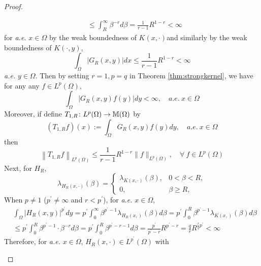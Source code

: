 \begin{proof}
\begin{enumerate}[label=(\Roman*)]
\begin{equation*}
\begin{aligned}
				& \leq \int_R^{\infty} \beta^{-r} d \beta=\frac{1}{r-1} R^{1-r}<\infty
			\end{aligned}
		\end{equation*}
		for \emph{a.e.} $x \in \Omega$ by the weak boundedness of $K(x,\cdot)$and similarly by the weak boundedness of $K(\cdot,y)$, 
		\begin{equation*}
			\int_{\Omega}\left|G_R(x, y)\right| d x \leq \frac{1}{r-1} R^{1-r}<\infty
		\end{equation*}
		\emph{a.e.} $y \in \Omega$. Then by setting $r = 1, p = q$ in Theorem \ref{thm:strongkernel}, we have for any any $f \in L^p(\Omega)$,
		\begin{equation*}
			\int_{\Omega}\left|G_R(x, y) f(y)\right| d y<\infty, \quad a.e. ~ x \in \Omega
		\end{equation*}
		Moreover, if define $T_{1,R} \colon L^p(\Omega) \rightarrow \mathbb{M}(\Omega)$ by
		\begin{equation*}
			\left(T_{1, R} f\right)(x):=\int_{\Omega} G_R(x, y) f(y) d y,\quad a.e.~ x \in \Omega
		\end{equation*}
		then
		\begin{equation*}
			\left\|T_{1, R} f\right\|_{L^p(\Omega)} \leq \frac{1}{r-1} R^{1-r}\|f\|_{L^p(\Omega)},\quad \forall~f \in L^p(\Omega)
		\end{equation*}
		Next, for $H_R$,
		\begin{equation*}
			\lambda_{H_R(x, \cdot)}(\beta)= \begin{cases}\lambda_{K(x, \cdot)}(\beta), & 0<\beta<R , \\ 0, & \beta \geq R ,\end{cases}
		\end{equation*}
		When $p \neq 1$ ($p^\prime \neq \infty$ and $r < p^\prime$), for \emph{a.e.} $x \in \Omega$,
		\begin{equation*}
			\begin{aligned}
				& \int_{\Omega}\left|H_R(x, y)\right|^{p^{\prime}} d y=p^{\prime} \int_0^{\infty} \beta^{p^{\prime}-1} \lambda_{H_R(x,)}(\beta) d \beta=p^{\prime} \int_0^R \beta^{p^{\prime}-1} \lambda_{K(x,)}(\beta) d \beta \\
				& \leq p^{\prime} \int_0^R \beta^{p^{\prime}-1} \cdot \beta^{-r} d \beta=p^{\prime} \int_0^R \beta^{p^{\prime}-r-1} d \beta=\frac{p^{\prime}}{p^{\prime}-r} R^{p^{\prime}-r}=\frac{q}{r} R^{\frac{r}{q} p^{\prime}}<\infty
			\end{aligned}
		\end{equation*}
		Therefore, for \emph{a.e.} $x \in \Omega$, $H_R(x, \cdot) \in L^{p^{\prime}}(\Omega)$ with

\end{enumerate}
\end{proof}
